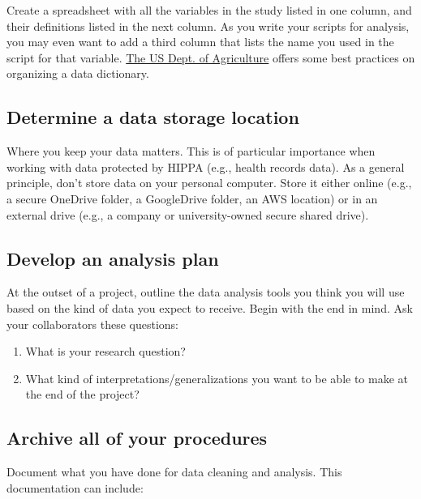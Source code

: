 \documentclass[
]{book}
\begin{document}
Create a spreadsheet with all the variables in the study listed in one column, and their definitions listed in the next column. As you write your scripts for analysis, you may even want to add a third column that lists the name you used in the script for that variable. \href{https://data.nal.usda.gov/manually-creating-data-dictionary}{The US Dept. of Agriculture} offers some best practices on organizing a data dictionary.

\hypertarget{determine-a-data-storage-location}{%
\subsection{Determine a data storage location}\label{determine-a-data-storage-location}}

Where you keep your data matters. This is of particular importance when working with data protected by HIPPA (e.g., health records data). As a general principle, don't store data on your personal computer. Store it either online (e.g., a secure OneDrive folder, a GoogleDrive folder, an AWS location) or in an external drive (e.g., a company or university-owned secure shared drive).

\hypertarget{develop-an-analysis-plan}{%
\subsection{Develop an analysis plan}\label{develop-an-analysis-plan}}

At the outset of a project, outline the data analysis tools you think you will use based on the kind of data you expect to receive. Begin with the end in mind. Ask your collaborators these questions:

\begin{enumerate}
\def\labelenumi{\arabic{enumi}.}
\item
  What is your research question?
\item
  What kind of interpretations/generalizations you want to be able to make at the end of the project?
\end{enumerate}

\hypertarget{archive-all-of-your-procedures}{%
\subsection{Archive all of your procedures}\label{archive-all-of-your-procedures}}

Document what you have done for data cleaning and analysis. This documentation can include:
\end{document}
